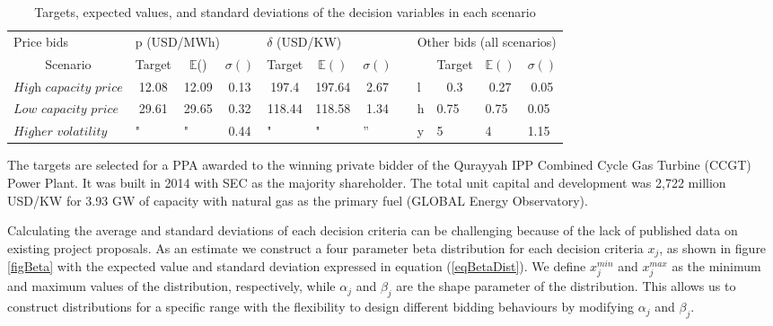 \documentclass[informs]{informs3}
\begin{document}
\begin{table}[tableScenarios]
\caption {Targets, expected values, and standard deviations of the decision variables in each scenario } \label{tableScenarios}
\begin{tabular}{@{}lcccccclllll@{}}
\cmidrule(r){1-7} \cmidrule(l){9-12}
Price bids                     & \multicolumn{3}{l}{p (USD/MWh)}                            & \multicolumn{3}{l}{$\delta$ (USD/KW)}                                  &  & \multicolumn{4}{l}{Other bids (all scenarios)}                                                       \\ \cmidrule(r){1-7} \cmidrule(l){9-12} 
\multicolumn{1}{c}{Scenario}   & Target                & $\mathbb{E}$()        & $\sigma()$ & Target                & $\mathbb{E}()$        & $\sigma()$             &  &   & \multicolumn{1}{c}{Target} & \multicolumn{1}{c}{$\mathbb{E}()$} & \multicolumn{1}{c}{$\sigma()$} \\
$\textit{High capacity price}$ & 12.08                 & 12.09                 & 0.13       & 197.4                 & 197.64                & 2.67                   &  & l & \multicolumn{1}{c}{0.3}    & \multicolumn{1}{c}{0.27}           & \multicolumn{1}{c}{0.05}       \\
$\textit{Low capacity price}$  & 29.61                 & 29.65                 & 0.32       & 118.44                & 118.58                & 1.34                   &  & h & 0.75                       & 0.75                               & 0.05                           \\
$\textit{Higher volatility}$  & \multicolumn{1}{l}{"} & \multicolumn{1}{l}{"} & 0.44       & \multicolumn{1}{l}{"} & \multicolumn{1}{l}{"} & \multicolumn{1}{l}{''} &  & y & 5                          & 4                                  & 1.15                           \\ \cmidrule(r){1-7} \cmidrule(l){9-12} 
\end{tabular}
\end{table}

The targets are selected for a PPA awarded to the winning private bidder of the Qurayyah IPP Combined Cycle Gas Turbine (CCGT) Power Plant. It was built in 2014 with SEC as the majority shareholder. The total unit capital and development was 2,722 million USD/KW for 3.93 GW of capacity with natural gas as the primary fuel (GLOBAL Energy Observatory).

Calculating the average and standard deviations of each decision criteria can be challenging because of the lack of published data on existing project proposals. As an estimate  we construct a four parameter beta distribution for each decision criteria $x_j$, as shown in figure \ref{figBeta}  with the expected value and standard deviation expressed in equation (\ref{eqBetaDist}). We define $x_j^{min}$ and $x_j^{max}$ as the minimum and maximum values of the distribution, respectively, while $\alpha_j$ and $\beta_j$ are the shape parameter of the distribution. This allows us to construct distributions for  a specific range with the flexibility to design different bidding behaviours by modifying $\alpha_j$ and $\beta_j$.
\end{document}
